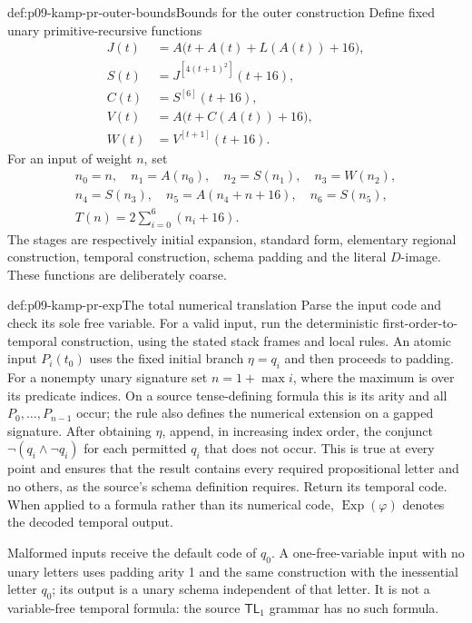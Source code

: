 \begin{hbdefinition}{def:p09-kamp-pr-outer-bounds}{Bounds for the outer construction}
Define fixed unary primitive-recursive functions
\[
\begin{aligned}
 J(t)&=A\bigl(t+A(t)+L(A(t))+16\bigr),\\
 S(t)&=J^{[4(t+1)^2]}(t+16),\\
 C(t)&=S^{[6]}(t+16),\\
 V(t)&=A\bigl(t+C(A(t))+16\bigr),\\
 W(t)&=V^{[t+1]}(t+16).
\end{aligned}
\]
For an input of weight \(n\), set
\[
\begin{gathered}
 n_0=n,\quad n_1=A(n_0),\quad n_2=S(n_1),\quad n_3=W(n_2),\\
 n_4=S(n_3),\quad n_5=A(n_4+n+16),\quad n_6=S(n_5),\\
                       T(n)=2\sum_{i=0}^{6}(n_i+16).
\end{gathered}
\]
The stages are respectively initial expansion, standard form, elementary
regional construction, temporal construction, schema padding and the
literal \(D\)-image. These functions are deliberately coarse.
\end{hbdefinition}

\begin{hbmethod}{def:p09-kamp-pr-exp}{The total numerical translation}
Parse the input code and check its sole free variable. For a valid input,
run the deterministic first-order-to-temporal construction, using the
stated stack frames and local rules. An atomic input \(P_i(t_0)\)
uses the fixed initial branch \(\eta=q_i\) and then proceeds to padding.
For a nonempty unary signature set \(n=1+\max i\), where the maximum
is over its predicate indices. On a source tense-defining formula this
is its arity and all \(P_0,\ldots,P_{n-1}\) occur; the rule also
defines the numerical extension on a gapped signature. After obtaining \(\eta\),
append, in increasing index order, the conjunct
\(\neg(q_i\land\neg q_i)\) for each permitted \(q_i\)
that does not occur. This is true at every point and ensures that
the result contains every required propositional letter and no others,
as the source's schema definition requires. Return its temporal code.
When applied to a formula rather than its numerical code,
\(\operatorname{Exp}(\varphi)\) denotes the decoded temporal output.

Malformed inputs receive the default code of \(q_0\). A one-free-variable
input with no unary letters uses padding arity 1 and the same construction
with the inessential letter \(q_0\); its output is a unary schema independent
of that letter. It is not a variable-free temporal formula: the source
\(\mathsf{TL}_1\) grammar has no such formula.
\end{hbmethod}

